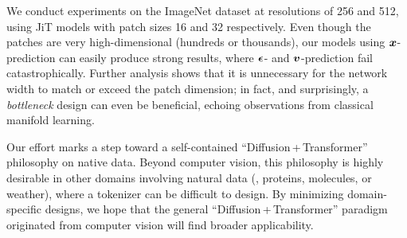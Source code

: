 We conduct experiments on the ImageNet dataset \cite{deng2009imagenet} at resolutions of 256 and 512, using JiT models with patch sizes 16 and 32 respectively. 
Even though the patches are very high-dimensional (hundreds or thousands), our models using $\bm{x}$-prediction can easily produce strong results, where $\bm{\epsilon}$- and $\bm{v}$-prediction fail catastrophically.  Further analysis shows that it is \mbox{unnecessary} for the network width to match or exceed the patch dimension; in fact, and surprisingly, a \textit{bottleneck} design can even be beneficial, echoing observations from classical manifold learning.

Our effort marks a step toward a self-contained ``Diffusion\,+\,Transformer'' philosophy \cite{Peebles2023} on native data. Beyond computer vision, this philosophy is highly desirable in other domains involving natural data (\eg, proteins, molecules, or weather), where a tokenizer can be difficult to design. By minimizing domain-specific designs, we hope that the general ``Diffusion\,+\,Transformer'' paradigm originated from computer vision will find broader applicability.